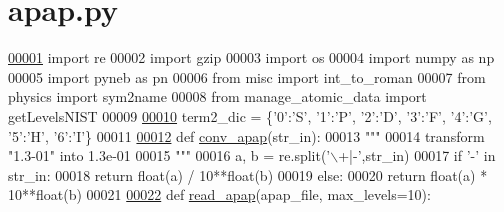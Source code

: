 \hypertarget{apap_8py_source}{}\section{apap.\+py}
\label{apap_8py_source}

\begin{DoxyCode}
\hypertarget{apap_8py_source_l00001}{}\hyperlink{namespacepyneb_1_1utils_1_1apap}{00001} \textcolor{keyword}{import} re
00002 \textcolor{keyword}{import} gzip
00003 \textcolor{keyword}{import} os
00004 \textcolor{keyword}{import} numpy \textcolor{keyword}{as} np
00005 \textcolor{keyword}{import} pyneb \textcolor{keyword}{as} pn
00006 \textcolor{keyword}{from} misc \textcolor{keyword}{import} int\_to\_roman 
00007 \textcolor{keyword}{from} physics \textcolor{keyword}{import} sym2name
00008 \textcolor{keyword}{from} manage\_atomic\_data \textcolor{keyword}{import} getLevelsNIST
00009 
\hypertarget{apap_8py_source_l00010}{}\hyperlink{namespacepyneb_1_1utils_1_1apap_aba49aa2681eafa29fc85cb550e4ce28a}{00010} term2\_dic = \{\textcolor{stringliteral}{'0'}:\textcolor{stringliteral}{'S'}, \textcolor{stringliteral}{'1'}:\textcolor{stringliteral}{'P'}, \textcolor{stringliteral}{'2'}:\textcolor{stringliteral}{'D'}, \textcolor{stringliteral}{'3'}:\textcolor{stringliteral}{'F'}, \textcolor{stringliteral}{'4'}:\textcolor{stringliteral}{'G'}, \textcolor{stringliteral}{'5'}:\textcolor{stringliteral}{'H'}, \textcolor{stringliteral}{'6'}:\textcolor{stringliteral}{'I'}\}
00011 
\hypertarget{apap_8py_source_l00012}{}\hyperlink{namespacepyneb_1_1utils_1_1apap_ad78f65e1ca140daa8a34fd88a91db97a}{00012} \textcolor{keyword}{def }\hyperlink{namespacepyneb_1_1utils_1_1apap_ad78f65e1ca140daa8a34fd88a91db97a}{conv\_apap}(str\_in):
00013     \textcolor{stringliteral}{"""}
00014 \textcolor{stringliteral}{    transform "1.3-01" into 1.3e-01 }
00015 \textcolor{stringliteral}{    """}
00016     a, b = re.split(\textcolor{stringliteral}{'\(\backslash\)+|-'},str\_in)
00017     \textcolor{keywordflow}{if} \textcolor{stringliteral}{'-'} \textcolor{keywordflow}{in} str\_in:
00018         \textcolor{keywordflow}{return} float(a) / 10**float(b)
00019     \textcolor{keywordflow}{else}:
00020         \textcolor{keywordflow}{return} float(a) * 10**float(b)
00021 
\hypertarget{apap_8py_source_l00022}{}\hyperlink{namespacepyneb_1_1utils_1_1apap_ad24a246526c0913b752319c5a2846412}{00022} \textcolor{keyword}{def }\hyperlink{namespacepyneb_1_1utils_1_1apap_ad24a246526c0913b752319c5a2846412}{read\_apap}(apap\_file, max\_levels=10):

\end{DoxyCode}
